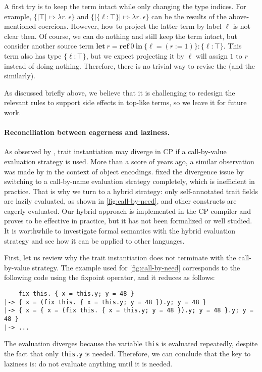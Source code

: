 A first try is to keep the term intact while only changing the type indices. For
example, $\{|\top| \Mapsto \lambda r.\ \epsilon\}$ and $\{|\{\ell:\top\}|
\Mapsto \lambda r.\ \epsilon\}$ can be the results of the above-mentioned
coercions. However, how to project the latter term by label $\ell$ is not clear
then. Of course, we can do nothing and still keep the term intact, but consider
another source term $\mathbf{let}\ r = \mathbf{ref}\ 0\ \mathbf{in}\ \{\ell = (r
:= 1)\} : \{\ell:\top\}$. This term also has type $\{\ell:\top\}$, but we expect
projecting it by $\ell$ will assign $1$ to $r$ instead of doing nothing.
Therefore, there is no trivial way to revise the  (and the
 similarly).

As discussed briefly above, we believe that it is challenging to redesign the
relevant rules to support side effects in top-like terms, so we leave it for
future work.

\paragraph{Reconciliation between eagerness and laziness.}
As observed by \citet{fan2022direct}, trait instantiation may diverge in CP if a
call-by-value evaluation strategy is used. More than a score of years ago, a
similar observation was made by \citet{bruce1999comparing} in the context of
object encodings. \citeauthor{fan2022direct} fixed the divergence issue by
switching to a call-by-name evaluation strategy completely, which is inefficient
in practice. That is why we turn to a hybrid strategy: only self-annotated trait
fields are lazily evaluated, as shown in \autoref{fig:call-by-need}, and other
constructs are eagerly evaluated. Our hybrid approach is implemented in the CP
compiler and proves to be effective in practice, but it has not been formalized
or well studied. It is worthwhile to investigate formal semantics with the
hybrid evaluation strategy and see how it can be applied to other languages.

First, let us review why the trait instantiation does not terminate with the
call-by-value strategy. The example used for \autoref{fig:call-by-need}
corresponds to the following code using the fixpoint operator, and it reduces as
follows:
\begin{lstlisting}
    fix this. { x = this.y; y = 48 }
|-> { x = (fix this. { x = this.y; y = 48 }).y; y = 48 }
|-> { x = { x = (fix this. { x = this.y; y = 48 }).y; y = 48 }.y; y = 48 }
|-> ...
\end{lstlisting}
The evaluation diverges because the variable \lstinline{this} is evaluated
repeatedly, despite the fact that only \lstinline{this.y} is needed. Therefore,
we can conclude that the key to laziness is: do not evaluate anything until it
is needed.

